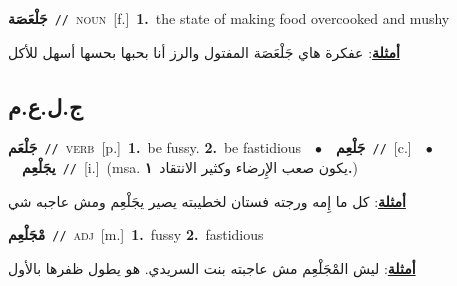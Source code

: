 \documentclass[10pt,a4paper,twoside]{article} %
\begin{document}
\begin{multicols}{2}
{\setlength\topsep{0pt}\textbf{\foreignlanguage{arabic}{جَلْعَصَة}}\ {\color{gray}\texttt{//}\color{black}}\ \textsc{noun}\ [f.]\ \textbf{1.}~the state of making food overcooked and mushy\  \begin{flushright}\color{gray}\foreignlanguage{arabic}{\textbf{\underline{\foreignlanguage{arabic}{أمثلة}}}: عفكرة هاي جَلْعَصَة المفتول والرز أنا بحبها بحسها أسهل للأكل}\end{flushright}\color{black}} \vspace{2mm}

\vspace{-3mm}
\subsection*{\color{blue}\foreignlanguage{arabic}{ج.ل.ع.م}\color{blue}{}} 

{\setlength\topsep{0pt}\textbf{\foreignlanguage{arabic}{جَلْعَم}}\ {\color{gray}\texttt{//}\color{black}}\ \textsc{verb}\ [p.]\ \textbf{1.}~be fussy.  \textbf{2.}~be fastidious\ \ $\bullet$\ \ \setlength\topsep{0pt}\textbf{\foreignlanguage{arabic}{جَلْعِم}}\ {\color{gray}\texttt{//}\color{black}}\ [c.]\ \ $\bullet$\ \ \setlength\topsep{0pt}\textbf{\foreignlanguage{arabic}{يجَلْعِم}}\ {\color{gray}\texttt{//}\color{black}}\ [i.]\ \color{gray}(msa. \foreignlanguage{arabic}{يكون صعب الإِرضاء وكثير الانتقاد}~\foreignlanguage{arabic}{\textbf{١.}})\color{black}\  \begin{flushright}\color{gray}\foreignlanguage{arabic}{\textbf{\underline{\foreignlanguage{arabic}{أمثلة}}}: كل ما إِمه ورجته فستان لخطيبته يصير يجَلْعِم ومش عاجبه شي}\end{flushright}\color{black}} \vspace{2mm}

{\setlength\topsep{0pt}\textbf{\foreignlanguage{arabic}{مْجَلْعِم}}\ {\color{gray}\texttt{//}\color{black}}\ \textsc{adj}\ [m.]\ \textbf{1.}~fussy  \textbf{2.}~fastidious\  \begin{flushright}\color{gray}\foreignlanguage{arabic}{\textbf{\underline{\foreignlanguage{arabic}{أمثلة}}}: ليش المْجَلْعِم مش عاجبته بنت السريدي. هو يطول ظفرها بالأول}\end{flushright}\color{black}} \vspace{2mm}


\end{multicols}
\end{document}
